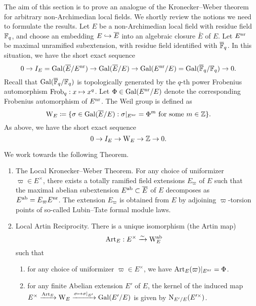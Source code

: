 \documentclass[../main.tex]{subfiles}
\begin{document}
The aim of this section is to prove an analogue of the Kronecker--Weber
theorem for arbitrary non-Archimedian local fields. We shortly review the
notions we need to formulate the results. Let $E$ be a non-Archimedian local
field with residue field $\mathbb{F}_q$, and choose an embedding $E \hookrightarrow \overline E$
into an algebraic closure $\bar E$ of $E$. 
Let $E^{\mathrm{nr}}$ be maximal unramified subextension, with residue field
identified with ${\overline {\mathbb{F}}_q}$.
In this situation, we have the short exact sequence
\begin{equation*}
  0 \to I_E = \operatorname{Gal}(\overline E/ E^{\mathrm{nr}}) \to \operatorname{Gal}(\overline E/E) \to \operatorname{Gal}(E^{\mathrm{nr}} /E) =
  \operatorname{Gal}(\overline {\mathbb{F}}_q /\mathbb{F}_q) \to 0.
\end{equation*}
Recall that $\operatorname{Gal}({\overline {\mathbb{F}}_q}/\mathbb{F}_q)$ is topologically generated by the $q$-th power
Frobenius automorphism $\mathrm{Frob}_q: x \mapsto x^q$. Let $\Phi \in \operatorname{Gal}(E^{\mathrm{nr}} /E)$ 
denote the corresponding Frobenius automorphism of $E^{\mathrm{nr}}$. 
The Weil group is defined as
\begin{equation*}
  \mathrm W_E \coloneq \{\sigma \in \operatorname{Gal}(\overline E/E) : \sigma|_{E^{\mathrm{nr}}} = \Phi^m
  \text{ for some } m \in \mathbb{Z}\}.
\end{equation*}
As above, we have the short exact sequence
\begin{equation*}
  0 \to I_E \to \mathrm W_E \to \mathbb{Z} \to 0.
\end{equation*}

We work towards the following Theorem.

\begin{thm}\label{thm:LocalKroneckerWeber} \leavevmode
  \vspace{-0.8em}
  \begin{enumerate}
    \item \textnormal{The Local Kronecker--Weber Theorem.} For any choice of uniformizer $\varpi \in E^\times$, there exists a 
      totally ramified field extensions $E_\varpi$ of $E$ such that 
      the maximal abelian subextension $E^{\mathrm{ab}} \subset \overline E$ of $E$
      decomposes as $E^{\mathrm{ab}} = E_\varpi E^{\mathrm{nr}}$. The extension 
      $E_\varpi$ is obtained from $E$ by adjoining $\varpi$-torsion points of so-called
      Lubin--Tate formal module laws. 
    \item \textnormal{Local Artin Reciprocity.} There is a unique isomorphism
      (the Artin map)
      \begin{equation*}
        \mathrm{Art}_E: E^\times \xrightarrow{\sim} \mathrm W_E^{\mathrm{ab}}
      \end{equation*}
      such that 
      \begin{enumerate}
        \item for any choice of uniformizer $\varpi \in E^\times$, we have
          $\mathrm{Art}_E(\varpi)|_{E^{\mathrm{nr}}} = \Phi$.
        \item for any finite Abelian extension $E'$ of $E$, the kernel of 
          the induced map $E^\times \xrightarrow{\mathrm{Art}_E} \mathrm W_E \xrightarrow{\sigma \mapsto
          \sigma|_{E'}} \operatorname{Gal}(E'/E)$ is given by $\mathrm{N}_{E'/E}(E'^\times)$.
      \end{enumerate}
  \end{enumerate}
\end{thm}
\end{document}
